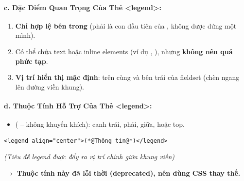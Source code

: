 \paragraph{c. Đặc Điểm Quan Trọng Của Thẻ <legend>:}
\begin{enumerate}[leftmargin=1.5em, itemsep=3pt, parsep=0pt]
    \item \textbf{Chỉ hợp lệ bên trong } (phải là con đầu tiên của , không được đứng một mình).
    \item Có thể chứa text hoặc inline elements (ví dụ , ), nhưng \textbf{không nên quá phức tạp}.
    \item \textbf{Vị trí hiển thị mặc định}: trên cùng và bên trái của fieldset (chèn ngang lên đường viền khung).
\end{enumerate}

\paragraph{d. Thuộc Tính Hỗ Trợ Của Thẻ <legend>:}
\begin{itemize}[leftmargin=1.5em, itemsep=3pt, parsep=0pt]
    \item {} ( – không khuyến khích): canh trái, phải, giữa, hoặc top.
\end{itemize}
\begin{codeWindow}
\begin{lstlisting}[language=HTML5]
<legend align="center">(*@Thông tin@*)</legend>
\end{lstlisting}
\end{codeWindow}

\begin{browserWindow}[Kết Quả Hiển Thị Trình Duyệt: Thẻ <legend align="center">]
\begin{tcolorbox}[
    enhanced, colback=white, colframe=gray!60, boxrule=0.6pt, arc=0pt,
    top=10pt, bottom=10pt, left=10pt, right=10pt,
    coltitle=darkText,
    title={\sffamily\small\textcolor{darkText}{Thông tin}},
    attach boxed title to top center={yshift=-6pt},
    boxed title style={colback=white, colframe=white, boxrule=0pt, left=4pt, right=4pt, top=0pt, bottom=0pt}
]
\sffamily\small\centering
\textcolor{gray!70}{\textit{(Tiêu đề legend được đẩy ra vị trí chính giữa khung viền)}}
\end{tcolorbox}
\end{browserWindow}
\textcolor{primaryBlue}{\textbf{$\rightarrow$}} \textbf{Thuộc tính này đã lỗi thời (deprecated), nên dùng CSS thay thế.}

